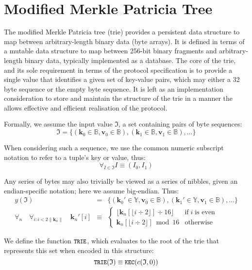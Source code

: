 \documentclass[9pt,oneside]{amsart}
\begin{document}
\section{Modified Merkle Patricia Tree}\label{app:trie}
The modified Merkle Patricia tree (trie) provides a persistent data structure to map between arbitrary-length binary data (byte arrays). It is defined in terms of a mutable data structure to map between 256-bit binary fragments and arbitrary-length binary data, typically implemented as a database. The core of the trie, and its sole requirement in terms of the protocol specification is to provide a single value that identifies a given set of key-value pairs, which may either a 32 byte sequence or the empty byte sequence. It is left as an implementation consideration to store and maintain the structure of the trie in a manner the allows effective and efficient realisation of the protocol.

Formally, we assume the input value $\mathfrak{I}$, a set containing pairs of byte sequences:
\begin{equation}
\mathfrak{I} = \{ (\mathbf{k}_0 \in \mathbb{B}, \mathbf{v}_0 \in \mathbb{B}), (\mathbf{k}_1 \in \mathbb{B}, \mathbf{v}_1 \in \mathbb{B}), ... \}
\end{equation}

When considering such a sequence, we use the common numeric subscript notation to refer to a tuple's key or value, thus:
\begin{equation}
\forall_{I \in \mathfrak{I}} I \equiv (I_0, I_1)
\end{equation}

Any series of bytes may also trivially be viewed as a series of nibbles, given an endian-specific notation; here we assume big-endian. Thus:
\begin{eqnarray}
y(\mathfrak{I}) & = & \{ (\mathbf{k}_0' \in \mathbb{Y}, \mathbf{v}_0 \in \mathbb{B}), (\mathbf{k}_1' \in \mathbb{Y}, \mathbf{v}_1 \in \mathbb{B}), ... \} \\
\forall_n \quad \forall_{i: i < 2\lVert\mathbf{k}_n\rVert} \quad \mathbf{k}_n'[i] & \equiv &
\begin{cases}
\lfloor \mathbf{k}_n[\lfloor i \div 2 \rfloor] \div 16 \rfloor & \text{if} \; i \; \text{is even} \\
\mathbf{k}_n[\lfloor i \div 2 \rfloor] \bmod 16 & \text{otherwise}
\end{cases}
\end{eqnarray}

We define the function $\texttt{\small TRIE}$, which evaluates to the root of the trie that represents this set when encoded in this structure:
\begin{equation}
\texttt{\small TRIE}(\mathfrak{I}) \equiv \texttt{\small KEC}(c(\mathfrak{I}, 0))
\end{equation}
\end{document}
